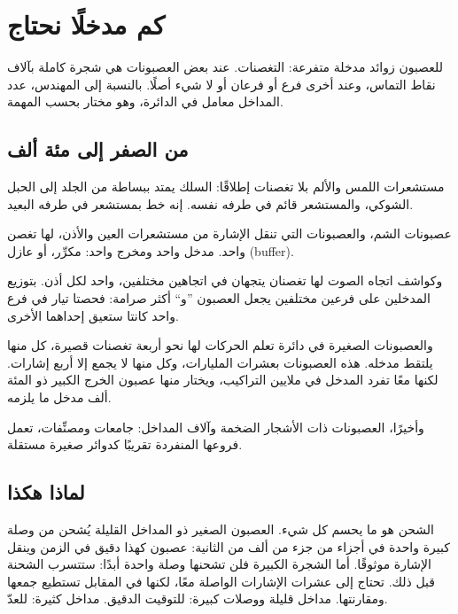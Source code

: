 \chapter{كم مدخلًا نحتاج}

للعصبون زوائد مدخلة متفرعة: التغصنات. عند بعض العصبونات هي شجرة كاملة بآلاف نقاط التماس، وعند أخرى فرع أو فرعان أو لا شيء أصلًا. بالنسبة إلى المهندس، عدد المداخل معامل في الدائرة، وهو مختار بحسب المهمة.

\section*{من الصفر إلى مئة ألف}

مستشعرات اللمس والألم بلا تغصنات إطلاقًا: السلك يمتد ببساطة من الجلد إلى الحبل الشوكي، والمستشعر قائم في طرفه نفسه. إنه خط بمستشعر في طرفه البعيد.


عصبونات الشم، والعصبونات التي تنقل الإشارة من مستشعرات العين والأذن، لها تغصن واحد. مدخل واحد ومخرج واحد: مكرِّر، أو عازل (\foreignlanguage{english}{buffer}).

وكواشف اتجاه الصوت لها تغصنان يتجهان في اتجاهين مختلفين، واحد لكل أذن. بتوزيع المدخلين على فرعين مختلفين يجعل العصبون ”و“ أكثر صرامة: فحصتا تيار في فرع واحد كانتا ستعيق إحداهما الأخرى.

والعصبونات الصغيرة في دائرة تعلم الحركات لها نحو أربعة تغصنات قصيرة، كل منها يلتقط مدخله. هذه العصبونات بعشرات المليارات، وكل منها لا يجمع إلا أربع إشارات. لكنها معًا تفرد المدخل في ملايين التراكيب، ويختار منها عصبون الخرج الكبير ذو المئة ألف مدخل ما يلزمه.

وأخيرًا، العصبونات ذات الأشجار الضخمة وآلاف المداخل: جامعات ومصنِّفات، تعمل فروعها المنفردة تقريبًا كدوائر صغيرة مستقلة.

\section*{لماذا هكذا}

الشحن هو ما يحسم كل شيء. العصبون الصغير ذو المداخل القليلة يُشحن من وصلة كبيرة واحدة في أجزاء من جزء من ألف من الثانية: عصبون كهذا دقيق في الزمن وينقل الإشارة موثوقًا. أما الشجرة الكبيرة فلن تشحنها وصلة واحدة أبدًا: ستتسرب الشحنة قبل ذلك. تحتاج إلى عشرات الإشارات الواصلة معًا، لكنها في المقابل تستطيع جمعها ومقارنتها. مداخل قليلة ووصلات كبيرة: للتوقيت الدقيق. مداخل كثيرة: للعدّ.

